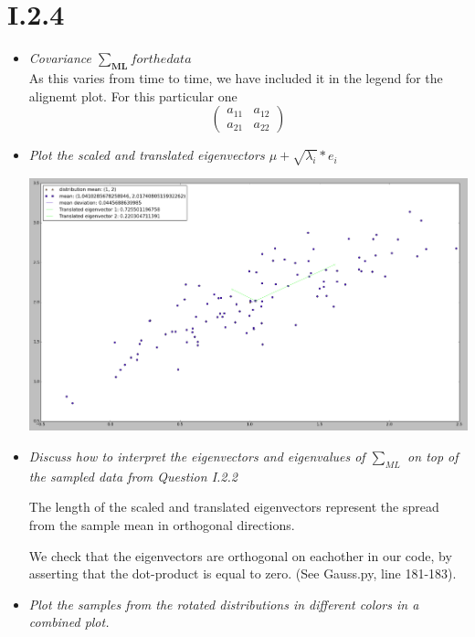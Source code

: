 \documentclass[12pt, a4paper]{article}
\begin{document}
\section{I.2.4}
\begin{itemize}
\item \textit{Covariance $\sum _{\textbf{ML}} for the data$}\\
As this varies from time to time, we have included it in the legend for the alignemt plot. For this particular one\\
\begin{equation}
\left( \begin{array}{cc}
a_{11} & a_{12} \\
a_{21} & a_{22} \end{array} \right)
\end{equation}

\item \textit{Plot the scaled and translated eigenvectors
$\mu + \sqrt{\lambda_i} * e_i$}

\includegraphics[width=\textwidth]{5.png}

\item \textit{Discuss how to interpret the
eigenvectors and eigenvalues of $\sum _{ML} $
on top of the sampled data from Question I.2.2}

The length of the scaled and translated eigenvectors represent the spread from the sample mean in orthogonal directions.

We check that the eigenvectors are orthogonal on eachother in our code, by asserting that the dot-product is equal to zero. (See Gauss.py, line 181-183).

\item \textit{Plot the samples from the rotated distributions in different colors in a combined plot.}


\end{itemize}
\end{document}
